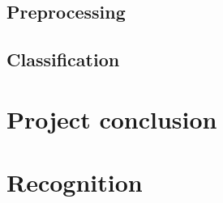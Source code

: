 \documentclass[11pt,a4paper,UKenglish]{article}
\begin{document}
\subsection{Preprocessing}
\subsection{Classification}

\section{Project conclusion}
\label{sec:Project conclusion}

\section{Recognition}
\label{sec:Recognition}




\end{document}

